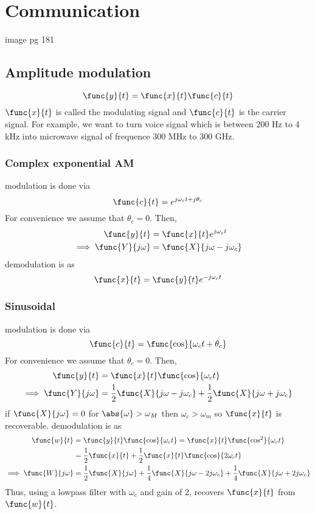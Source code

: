 \chapter{Communication}
image pg 181

\section{Amplitude modulation}
\begin{equation*}
    \func{y}{t} = \func{x}{t} \func{c}{t}
\end{equation*}
\(\func{x}{t}\) is called the modulating signal and \(\func{c}{t}\) is the carrier signal. For example, we want to turn voice signal which is between 200 Hz to 4 kHz into microwave signal of frequence 300 MHz to 300 GHz.
\subsection*{Complex exponential AM}
modulation is done via 
\begin{equation*}
    \func{c}{t} = e^{j\omega_c t + j\theta_c}
\end{equation*} 
For convenience we assume that \(\theta_c = 0\). Then, 
\begin{align*}
    \func{y}{t} &= \func{x}{t} e^{j\omega_c t}\\
    \implies \func{Y}{j\omega} &= \func{X}{j\omega - j \omega_c}
\end{align*}
demodulation is as 
\begin{equation*}
    \func{x}{t} = \func{y}{t} e^{-j\omega_c t}
\end{equation*}
\subsection*{Sinusoidal}
modulation is done via 
\begin{equation*}
    \func{c}{t} = \func{\cos}{\omega_c t + \theta_c}
\end{equation*} 
For convenience we assume that \(\theta_c = 0\). Then, 
\begin{align*}
    \func{y}{t} &= \func{x}{t} \func{\cos}{\omega_c t}\\
    \implies \func{Y}{j\omega} &= \dfrac{1}{2} \func{X}{j\omega - j \omega_c} + \dfrac{1}{2} \func{X}{j\omega + j \omega_c}
\end{align*}
if \(\func{X}{j\omega}  = 0\) for \(\abs{\omega} > \omega_M\) then \(\omega_c > \omega_m\) so \(\func{x}{t}\) is recoverable. demodulation is as 
\begin{align*}
    \func{w}{t} &= \func{y}{t} \func{\cos}{\omega_c t} = \func{x}{t} \func{\cos^2}{\omega_c t} \\
    &= \dfrac{1}{2} \func{x}{t} + \dfrac{1}{2} \func{x}{t} \func{\cos}{2\omega_c t}\\
    \implies \func{W}{j\omega} &= \dfrac{1}{2} \func{X}{j\omega} + \dfrac{1}{4} \func{X}{j\omega - 2j\omega_c} + \dfrac{1}{4} \func{X}{j\omega + 2j\omega_c}
\end{align*}
Thus, using a lowpass filter with \(\omega_c\) and gain of 2, recovers \(\func{x}{t}\) from \(\func{w}{t}\). 


